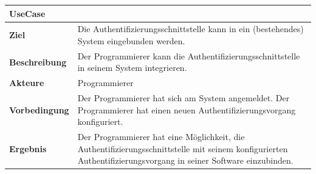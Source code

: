 \begin{longtable}[c]{@{}ll@{}}
\toprule
\begin{minipage}[b]{0.34\columnwidth}\raggedright\strut
\textbf{UseCase}
\strut\end{minipage} &
\begin{minipage}[b]{0.60\columnwidth}\raggedright\strut
\strut\end{minipage}\tabularnewline
\midrule
\endhead
\begin{minipage}[t]{0.34\columnwidth}\raggedright\strut
\textbf{Ziel}
\strut\end{minipage} &
\begin{minipage}[t]{0.60\columnwidth}\raggedright\strut
Die Authentifizierungsschnittstelle kann in ein (bestehendes) System
eingebunden werden.
\strut\end{minipage}\tabularnewline
\begin{minipage}[t]{0.34\columnwidth}\raggedright\strut
\textbf{Beschreibung}
\strut\end{minipage} &
\begin{minipage}[t]{0.60\columnwidth}\raggedright\strut
Der Programmierer kann die Authentifizierungsschnittstelle in seinem
System integrieren.
\strut\end{minipage}\tabularnewline
\begin{minipage}[t]{0.34\columnwidth}\raggedright\strut
\textbf{Akteure}
\strut\end{minipage} &
\begin{minipage}[t]{0.60\columnwidth}\raggedright\strut
Programmierer
\strut\end{minipage}\tabularnewline
\begin{minipage}[t]{0.34\columnwidth}\raggedright\strut
\textbf{Vorbedingung}
\strut\end{minipage} &
\begin{minipage}[t]{0.60\columnwidth}\raggedright\strut
Der Programmierer hat sich am System angemeldet. Der Programmierer hat
einen neuen Authentifizierungsvorgang konfiguriert.
\strut\end{minipage}\tabularnewline
\begin{minipage}[t]{0.34\columnwidth}\raggedright\strut
\textbf{Ergebnis}
\strut\end{minipage} &
\begin{minipage}[t]{0.60\columnwidth}\raggedright\strut
Der Programmierer hat eine Möglichkeit, die
Authentifizierungsschnittstelle mit seinem konfigurierten
Authentifizierungsvorgang in seiner Software einzubinden.
\strut\end{minipage}\tabularnewline

\end{longtable}
